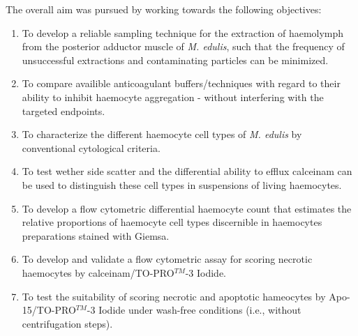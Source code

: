 \noindent The overall aim was pursued by working towards the following objectives:

\begin{enumerate}
    \item To develop a reliable sampling technique for the extraction of haemolymph from the posterior adductor muscle of \emph{M. edulis}, such that the frequency of unsuccessful extractions and contaminating particles can be minimized.
    \item To compare availible anticoagulant buffers/techniques with regard to their ability to inhibit haemocyte aggregation - without interfering with the targeted endpoints.
    \item To characterize the different haemocyte cell types of \emph{M. edulis} by conventional cytological criteria.
    \item To test wether side scatter and the differential ability to efflux \acrshort{calceinam} can be used to distinguish these cell types in suspensions of living haemocytes.
    \item To develop a flow cytometric differential haemocyte count that estimates the relative proportions of haemocyte cell types discernible in haemocytes preparations stained with Giemsa.
    \item To develop and validate a flow cytometric assay for scoring necrotic haemocytes by \acrshort{calceinam}/TO-PRO$^{TM}$-3 Iodide.
    \item To test the suitability of scoring necrotic and apoptotic hameocytes by Apo-15/TO-PRO$^{TM}$-3 Iodide under wash-free conditions (i.e., without centrifugation steps).
\end{enumerate}